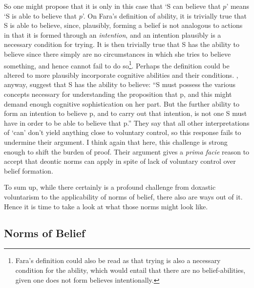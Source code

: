 \documentclass[12pt,numbers=noenddot]{scrartcl}
\begin{document}
So one might propose that it is only in this case that ‘S can believe that $p$’ means ‘S is able to believe that $p$’. On Fara's definition of ability, it is trivially true that S is able to believe, since, plausibly, forming a belief is not analogous to actions in that it is formed through an \emph{intention}, and an intention plausibly is a necessary condition for trying. It is then trivially true that S has the ability to believe since there simply are no circumstances in which she tries to believe something, and hence cannot fail to do so\footnote{Fara's definition could also be read as that trying is also a necessary condition for the ability, which would entail that there are no belief-abilities, given one does not form believes intentionally.}. Perhaps the definition could be altered to more plausibly incorporate cognitive abilities and their conditions. \textcite[618]{Chuard2009-CHUENW}, anyway, suggest that S has the ability to believe: “S must possess the various concepts necessary for understanding the proposition that p, and this might demand enough cognitive sophistication on her part. But the further ability to form an intention to believe p, and to carry out that intention, is not one S must have in order to be able to believe that p.” They say that all other interpretations of ‘can’ don't yield anything close to voluntary control, so this response fails to undermine their argument. I think again that here, this challenge is strong enough to shift the burden of proof. Their argument gives a \emph{prima facie} reason to accept that deontic norms can apply in spite of lack of voluntary control over belief formation.

To sum up, while there certainly is a profound challenge from doxastic voluntarism to the applicability of norms of belief, there also are ways out of it. Hence it is time to take a look at what those norms might look like.

\subsection{ Norms of Belief }\label{sec:normsofbelief}
\end{document}
